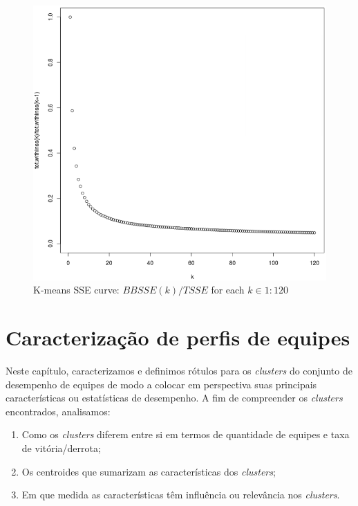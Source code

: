 \begin{figure}
  \centering
  \includegraphics[width=1.0\textwidth]{k-means-curve}%
  \caption{K-means SSE curve: $BBSSE(k)/TSSE$   for each  $k \in {1:120}$}
  \label{fig:k-means-curve}
\end{figure}

\chapter{Caracterização de perfis de equipes}

Neste capítulo, caracterizamos e definimos rótulos para os \textit{clusters} do conjunto de desempenho de equipes de modo a colocar em perspectiva suas principais características ou estatísticas de desempenho. A fim de compreender os \textit{clusters} encontrados, analisamos:

\begin{enumerate}[label=(\roman*)]
 \item Como os \textit{clusters} diferem entre si em termos de quantidade de equipes e taxa de vitória/derrota;
 \item Os centroides que sumarizam as características dos \textit{clusters};
 \item Em que medida as características têm influência ou relevância nos \textit{clusters}.
\end{enumerate}

